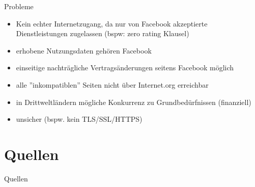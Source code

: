 \documentclass{beamer}
\begin{document}
\begin{frame}{Probleme}
\begin{itemize}
	\item Kein echter Internetzugang, da nur von Facebook akzeptierte Dienstleistungen zugelassen (bspw: zero rating Klausel)
	\item erhobene Nutzungsdaten gehören Facebook
	\item einseitige nachträgliche Vertragsänderungen seitens Facebook möglich
	\item alle ''inkompatiblen'' Seiten nicht über Internet.org erreichbar
	\item in Drittweltländern mögliche Konkurrenz zu Grundbedürfnissen (finanziell)
	\item unsicher (bspw. kein TLS/SSL/HTTPS)
\end{itemize}
\end{frame}


\section*{Quellen}
\begin{frame}[shrink=10]{Quellen}


\end{frame}
\end{document}

